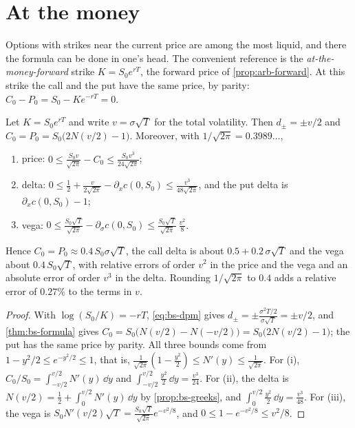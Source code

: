 
\section{At the money}\label{sec:bs-atm}

Options with strikes near the current price are among the most liquid, and there the
formula can be done in one's head. The convenient reference is the \emph{at-the-money-forward} strike
$K=S_0e^{rT}$, the forward price of \cref{prop:arb-forward}. At this strike the call and the
put have the same price, by parity: $C_0-P_0=S_0-Ke^{-rT}=0$.

\begin{proposition}\label{prop:bs-atm}
Let $K=S_0e^{rT}$ and write $v=\sigma\sqrt T$ for the total volatility. Then $d_\pm=\pm v/2$
and $C_0=P_0=S_0\big(2N(v/2)-1\big)$. Moreover, with $1/\sqrt{2\pi}=0.3989\ldots$,
\begin{enumerate}[label=(\roman*)]
  \item price: $\displaystyle 0\le\frac{S_0v}{\sqrt{2\pi}}-C_0\le\frac{S_0v^3}{24\sqrt{2\pi}}$;
  \item delta: $\displaystyle 0\le\frac12+\frac{v}{2\sqrt{2\pi}}-\partial_xc(0,S_0)\le\frac{v^3}{48\sqrt{2\pi}}$,
    and the put delta is $\partial_xc(0,S_0)-1$;
  \item vega: $\displaystyle 0\le\frac{S_0\sqrt T}{\sqrt{2\pi}}-\partial_\sigma c(0,S_0)\le\frac{S_0\sqrt T}{\sqrt{2\pi}}\,\frac{v^2}{8}$.
\end{enumerate}
Hence $C_0=P_0\approx0.4\,S_0\sigma\sqrt T$, the call delta is about $0.5+0.2\,\sigma\sqrt T$
and the vega about $0.4\,S_0\sqrt T$, with relative errors of order $v^2$ in the price and
the vega and an absolute error of order $v^3$ in the delta. Rounding $1/\sqrt{2\pi}$ to $0.4$
adds a relative error of $0.27\%$ to the terms in $v$.
\end{proposition}

\begin{proof}
With $\log(S_0/K)=-rT$, \eqref{eq:bs-dpm} gives $d_\pm=\pm\frac{\sigma^2T/2}{\sigma\sqrt T}=\pm v/2$,
and \cref{thm:bs-formula} gives $C_0=S_0\big(N(v/2)-N(-v/2)\big)=S_0\big(2N(v/2)-1\big)$; the
put has the same price by parity. All three bounds come from $1-y^2/2\le e^{-y^2/2}\le1$,
that is, $\frac{1}{\sqrt{2\pi}}(1-\frac{y^2}2)\le N'(y)\le\frac1{\sqrt{2\pi}}$. For (i),
$C_0/S_0=\int_{-v/2}^{v/2}N'(y)\,\dd y$ and $\int_{-v/2}^{v/2}\frac{y^2}{2}\,\dd y=\frac{v^3}{24}$. For
(ii), the delta is $N(v/2)=\frac12+\int_0^{v/2}N'(y)\,\dd y$ by \cref{prop:bs-greeks}, and
$\int_0^{v/2}\frac{y^2}2\,\dd y=\frac{v^3}{48}$. For (iii), the vega is
$S_0N'(v/2)\sqrt T=\frac{S_0\sqrt T}{\sqrt{2\pi}}e^{-v^2/8}$, and $0\le1-e^{-v^2/8}\le v^2/8$.
\end{proof}

